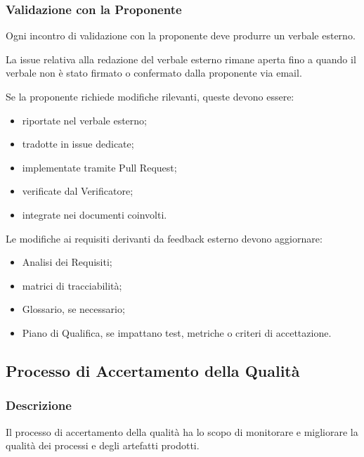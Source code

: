 \subsubsection{Validazione con la Proponente}

Ogni incontro di validazione con la proponente deve produrre un verbale esterno.

La issue relativa alla redazione del verbale esterno rimane aperta fino a quando
il verbale non è stato firmato o confermato dalla proponente via email.

Se la proponente richiede modifiche rilevanti, queste devono essere:

\begin{itemize}
    \item riportate nel verbale esterno;
    \item tradotte in issue dedicate;
    \item implementate tramite Pull Request;
    \item verificate dal Verificatore;
    \item integrate nei documenti coinvolti.
\end{itemize}

Le modifiche ai requisiti derivanti da feedback esterno devono aggiornare:

\begin{itemize}
    \item Analisi dei Requisiti;
    \item matrici di tracciabilità;
    \item Glossario, se necessario;
    \item Piano di Qualifica, se impattano test, metriche o criteri di accettazione.
\end{itemize}


\subsection{Processo di Accertamento della Qualità}
\label{sec:qualita}

\subsubsection{Descrizione}

Il processo di accertamento della qualità ha lo scopo di monitorare e migliorare
la qualità dei processi e degli artefatti prodotti.

